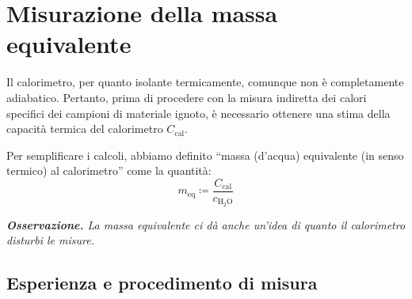 \documentclass{article}
\begin{document}
\section{Misurazione della massa equivalente}

Il calorimetro, per quanto isolante termicamente, comunque non è completamente
adiabatico. Pertanto, prima di procedere con la misura indiretta dei calori
specifici dei campioni di materiale ignoto, è necessario ottenere una stima
della capacità termica del calorimetro $C_\text{cal}$.

Per semplificare i calcoli, abbiamo definito “massa (d'acqua) equivalente
(in senso termico) al calorimetro” come la quantità:
\[m_\text{eq} \coloneqq \frac{C_\text{cal}}{c_{\text{H}_2\text{O}}}\]

\emph{
\textbf{Osservazione.} La massa equivalente ci dà anche un'idea di
quanto il calorimetro disturbi le misure.
}

\subsection{Esperienza e procedimento di misura}
\end{document}
